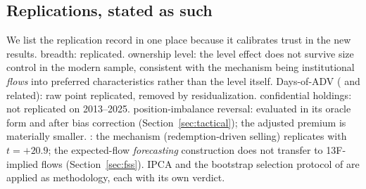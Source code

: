 \subsection{Replications, stated as such}
\label{sec:replications}

We list the replication record in one place because it calibrates
trust in the new results. \citet{chs2002} breadth: replicated.
\citet{gompers2001} ownership level: the level effect does not
survive size control in the modern sample, consistent with the
mechanism being institutional \emph{flows} into preferred
characteristics rather than the level itself. Days-of-ADV
(\citet{chincarini2020} and related): raw point replicated, removed
by residualization. \citet{agarwal2013} confidential holdings: not
replicated on 2013--2025. \citet{miori2022} position-imbalance
reversal: evaluated in its oracle form and after bias correction
(Section~\ref{sec:tactical}); the adjusted premium is materially
smaller. \citet{coval2007}: the mechanism (redemption-driven selling)
replicates with $t=+20.9$; the expected-flow \emph{forecasting}
construction does not transfer to 13F-implied flows
(Section~\ref{sec:fss}). \citet{kps2019} IPCA and the bootstrap
selection protocol of \citet{oliveira2025} are applied as
methodology, each with its own verdict.
